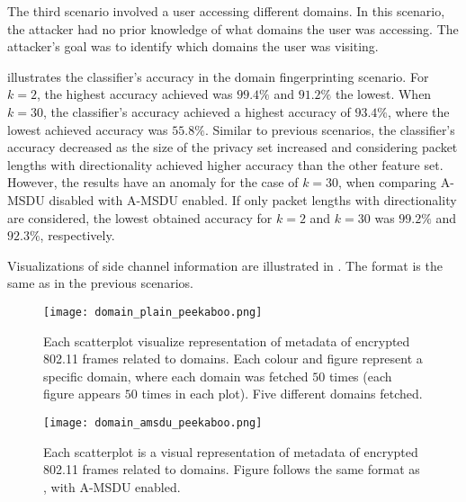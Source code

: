The third scenario involved a user accessing different domains. In this scenario, the attacker had no prior knowledge of what domains the user was accessing. The attacker's goal was to identify which domains the user was visiting.

 illustrates the classifier's accuracy in the domain fingerprinting scenario. For $k=2$, the highest accuracy achieved was $99.4\%$ and $91.2\%$ the lowest. When $k=30$, the classifier's accuracy achieved a highest accuracy of $93.4\%$, where the lowest achieved accuracy was $55.8\%$. Similar to previous scenarios, the classifier's accuracy decreased as the size of the privacy set increased and considering packet lengths with directionality achieved higher accuracy than the other feature set. However, the results have an anomaly for the case of $k=30$, when comparing A-MSDU disabled with A-MSDU enabled. If only packet lengths with directionality are considered, the lowest obtained accuracy for $k=2$ and $k=30$ was $99.2\%$ and $92.3\%$, respectively.

Visualizations of side channel information are illustrated in . The format is the same as in the previous scenarios.

\begin{figure}
	\centering
        \texttt{[image: domain\_plain\_peekaboo.png]}
        \caption{Each scatterplot visualize representation of metadata of encrypted 802.11 frames related to domains. Each colour and figure represent a specific domain, where each domain was fetched $50$ times (each figure appears $50$ times in each plot). Five different domains fetched.}
           \label{fig:domain_plain_peekaboo}
\end{figure}

\begin{figure}
	\centering
        \texttt{[image: domain\_amsdu\_peekaboo.png]}
           \caption{Each scatterplot is a visual representation of metadata of encrypted 802.11 frames related to domains. Figure follows the same format as , with A-MSDU enabled.}
    \label{fig:domain_amsdu_peekaboo}
\end{figure}


\clearpage